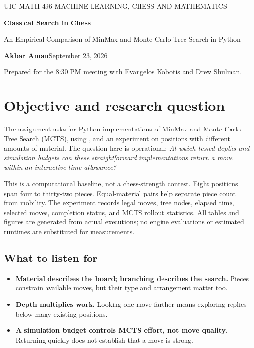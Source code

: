 \documentclass[10pt,letterpaper]{article}
\newcommand{\code}[1]{\texttt{\detokenize{#1}}}
\begin{document}
\thispagestyle{empty}
{\color{teal}\small UIC MATH 496 \quad MACHINE LEARNING, CHESS AND MATHEMATICS}
\vspace{0.25in}

{\color{navy}\LARGE\bfseries Classical Search in Chess\par}
\vspace{0.06in}
{\large An Empirical Comparison of MinMax and Monte Carlo Tree Search in Python\par}
\vspace{0.15in}
\textbf{Akbar Aman}\hfill September 23, 2026\par
Prepared for the 8:30 PM meeting with Evangelos Kobotis and Drew Shulman.

\section{Objective and research question}
The assignment asks for Python implementations of MinMax and Monte Carlo Tree Search (MCTS), using \code{python-chess}, and an experiment on positions with different amounts of material. The question here is operational: \emph{At which tested depths and simulation budgets can these straightforward implementations return a move within an interactive time allowance?}

This is a computational baseline, not a chess-strength contest. Eight positions span four to thirty-two pieces. Equal-material pairs help separate piece count from mobility. The experiment records legal moves, tree nodes, elapsed time, selected moves, completion status, and MCTS rollout statistics. All tables and figures are generated from actual executions; no engine evaluations or estimated runtimes are substituted for measurements.

\subsection*{What to listen for}
\begin{itemize}
\item \textbf{Material describes the board; branching describes the search.} Pieces constrain available moves, but their type and arrangement matter too.
\item \textbf{Depth multiplies work.} Looking one move farther means exploring replies below many existing positions.
\item \textbf{A simulation budget controls MCTS effort, not move quality.} Returning quickly does not establish that a move is strong.
\end{itemize}
\end{document}
